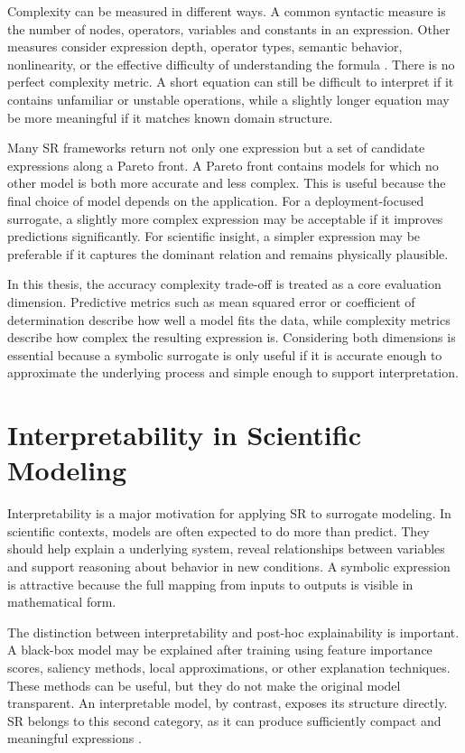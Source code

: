 \documentclass[12pt,oneside,bibtotoc,liststotoc]{scrbook}
\begin{document}
Complexity can be measured in different ways. A common syntactic measure is the number of nodes, operators, variables and constants in an expression. Other measures consider expression depth, operator types, semantic behavior, nonlinearity, or the effective difficulty of understanding the formula \cite{lacava2021contemporary,dong2025recent}. There is no perfect complexity metric. A short equation can still be difficult to interpret if it contains unfamiliar or unstable operations, while a slightly longer equation may be more meaningful if it matches known domain structure.

Many SR frameworks return not only one expression but a set of candidate expressions along a Pareto front. A Pareto front contains models for which no other model is both more accurate and less complex. This is useful because the final choice of model depends on the application. For a deployment-focused surrogate, a slightly more complex expression may be acceptable if it improves predictions significantly. For scientific insight, a simpler expression may be preferable if it captures the dominant relation and remains physically plausible.

In this thesis, the accuracy complexity trade-off is treated as a core evaluation dimension. Predictive metrics such as mean squared error or coefficient of determination describe how well a model fits the data, while complexity metrics describe how complex the resulting expression is. Considering both dimensions is essential because a symbolic surrogate is only useful if it is accurate enough to approximate the underlying process and simple enough to support interpretation.

\section{Interpretability in Scientific Modeling}

Interpretability is a major motivation for applying SR to surrogate modeling. In scientific contexts, models are often expected to do more than predict. They should help explain a underlying system, reveal relationships between variables and support reasoning about behavior in new conditions. A symbolic expression is attractive because the full mapping from inputs to outputs is visible in mathematical form.

The distinction between interpretability and post-hoc explainability is important. A black-box model may be explained after training using feature importance scores, saliency methods, local approximations, or other explanation techniques. These methods can be useful, but they do not make the original model transparent. An interpretable model, by contrast, exposes its structure directly. SR belongs to this second category, as it can produce sufficiently compact and meaningful expressions \cite{makke2024interpretable}.
\end{document}

